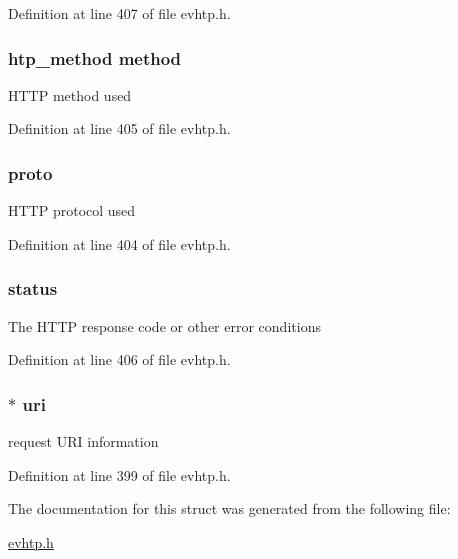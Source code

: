 \-Definition at line 407 of file evhtp.\-h.

\hypertarget{structevhtp__request__s_a5322aefd6f774a31c7cbfaeee0d3a417}{
\subsubsection[{method}]{\setlength{\rightskip}{0pt plus 5cm}htp\-\_\-method {\bf method}}}\label{structevhtp__request__s_a5322aefd6f774a31c7cbfaeee0d3a417}
\-H\-T\-T\-P method used 

\-Definition at line 405 of file evhtp.\-h.

\hypertarget{structevhtp__request__s_a3acae974abf6e95063cab796fbe2a7f6}{
\subsubsection[{proto}]{ {\bf proto}}}\label{structevhtp__request__s_a3acae974abf6e95063cab796fbe2a7f6}
\-H\-T\-T\-P protocol used 

\-Definition at line 404 of file evhtp.\-h.

\hypertarget{structevhtp__request__s_a9342eb644f9122b975cf9e2aed3cc00c}{
\subsubsection[{status}]{ {\bf status}}}\label{structevhtp__request__s_a9342eb644f9122b975cf9e2aed3cc00c}
\-The \-H\-T\-T\-P response code or other error conditions 

\-Definition at line 406 of file evhtp.\-h.

\hypertarget{structevhtp__request__s_adfdac9f1ecf15761c62699a52d855a49}{
\subsubsection[{uri}]{$\ast$ {\bf uri}}}\label{structevhtp__request__s_adfdac9f1ecf15761c62699a52d855a49}
request \-U\-R\-I information 

\-Definition at line 399 of file evhtp.\-h.



\-The documentation for this struct was generated from the following file\-:\begin{DoxyCompactItemize}
\item 
\hyperlink{evhtp_8h}{evhtp.\-h}\end{DoxyCompactItemize}
